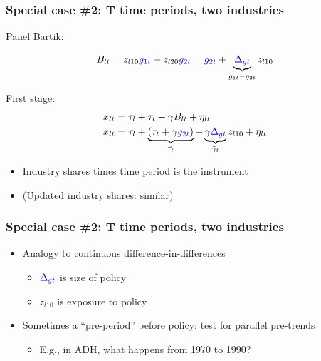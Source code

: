 \documentclass[notes,11pt, aspectratio=169]{beamer}
\begin{document}
\begin{frame}
\frametitle{Special case \#2:  T time periods, two industries }



Panel Bartik:

$$B_{lt} = z_{l10} \textcolor{blue}{g_{1t}}  +z_{l20} \textcolor{blue}{g_{2t}} = \textcolor{blue}{g_{2t}} + \underbrace{ \textcolor{blue}{\Delta_{gt}}}_{g_{1t}-g_{2t}} z_{l10}$$




First stage:
\begin{align}
x_{lt} & =\tau_{l}+\tau_{t}+ \gamma B_{lt} +\eta_{lt} \notag\\
x_{lt} & =\tau_{l}+\underbrace{(\tau_{t}+\gamma \textcolor{blue}{g_{2t}})}_{\tilde{\tau_{t}}}+\underbrace{\gamma  \textcolor{blue}{\Delta_{gt}}}_{\tilde{\gamma}_{t}}z_{l10}+\eta_{lt} \notag
\end{align}




\begin{itemize}
\item Industry shares times time period is the instrument
\item (Updated industry shares: similar)
\end{itemize}


\end{frame}



\begin{frame}
\frametitle{Special case \#2:  T time periods, two industries }

\begin{itemize}
	\setlength\itemsep{1em}
\item Analogy to continuous difference-in-differences 
	\begin{itemize}
	\setlength\itemsep{1em}
	\item $\textcolor{blue}{\Delta_{gt}}$ is size of policy 
	\item $z_{l10}$ is exposure to policy
	\end{itemize} 
\item Sometimes a ``pre-period'' before policy: test for parallel pre-trends 
	\begin{itemize}
	\setlength\itemsep{1em}
	\item E.g., in ADH, what happens from 1970 to 1990?
	\end{itemize}
\end{itemize}
\end{frame}
\end{document}
